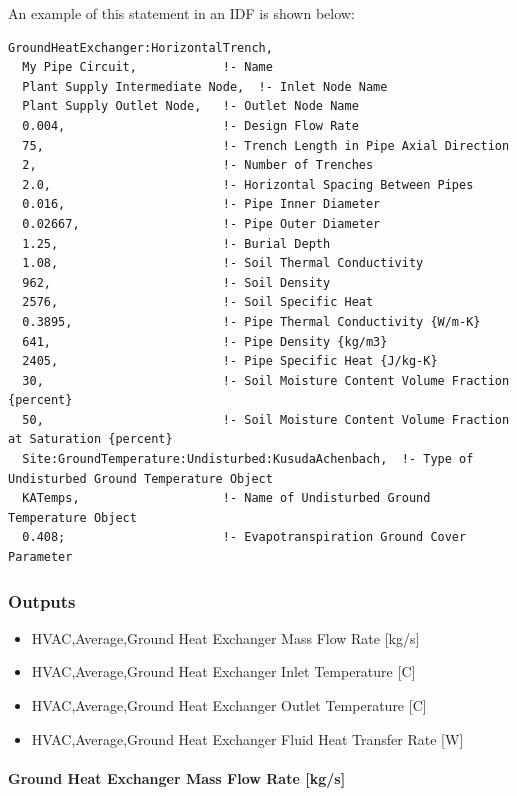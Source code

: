 An example of this statement in an IDF is shown below:

\begin{lstlisting}
GroundHeatExchanger:HorizontalTrench,
  My Pipe Circuit,            !- Name
  Plant Supply Intermediate Node,  !- Inlet Node Name
  Plant Supply Outlet Node,   !- Outlet Node Name
  0.004,                      !- Design Flow Rate
  75,                         !- Trench Length in Pipe Axial Direction
  2,                          !- Number of Trenches
  2.0,                        !- Horizontal Spacing Between Pipes
  0.016,                      !- Pipe Inner Diameter
  0.02667,                    !- Pipe Outer Diameter
  1.25,                       !- Burial Depth
  1.08,                       !- Soil Thermal Conductivity
  962,                        !- Soil Density
  2576,                       !- Soil Specific Heat
  0.3895,                     !- Pipe Thermal Conductivity {W/m-K}
  641,                        !- Pipe Density {kg/m3}
  2405,                       !- Pipe Specific Heat {J/kg-K}
  30,                         !- Soil Moisture Content Volume Fraction {percent}
  50,                         !- Soil Moisture Content Volume Fraction at Saturation {percent}
  Site:GroundTemperature:Undisturbed:KusudaAchenbach,  !- Type of Undisturbed Ground Temperature Object
  KATemps,                    !- Name of Undisturbed Ground Temperature Object
  0.408;                      !- Evapotranspiration Ground Cover Parameter
\end{lstlisting}

\subsubsection{Outputs}\label{outputs-14-000}

\begin{itemize}
\item
  HVAC,Average,Ground Heat Exchanger Mass Flow Rate {[}kg/s{]}
\item
  HVAC,Average,Ground Heat Exchanger Inlet Temperature {[}C{]}
\item
  HVAC,Average,Ground Heat Exchanger Outlet Temperature {[}C{]}
\item
  HVAC,Average,Ground Heat Exchanger Fluid Heat Transfer Rate {[}W{]}
\end{itemize}

\paragraph{Ground Heat Exchanger Mass Flow Rate {[}kg/s{]}}\label{ground-heat-exchanger-mass-flow-rate-kgs-3}


